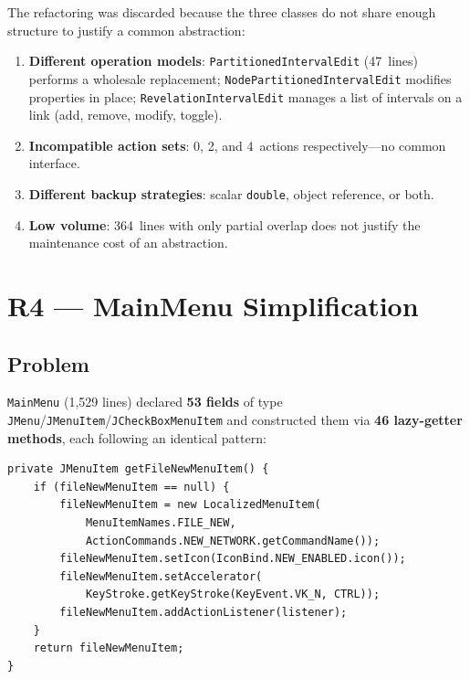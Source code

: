 \documentclass[12pt,a4paper]{article}
\newcommand{\code}[1]{\texttt{#1}}
\newcommand{\cls}[1]{\texttt{#1}}
\begin{document}
The refactoring was discarded because the three classes do not share
enough structure to justify a common abstraction:

\begin{enumerate}
  \item \textbf{Different operation models}:
    \cls{PartitionedIntervalEdit} (47~lines) performs a wholesale
    replacement; \cls{NodePartitionedIntervalEdit} modifies properties
    in place; \cls{RevelationIntervalEdit} manages a list of
    intervals on a link (add, remove, modify, toggle).

  \item \textbf{Incompatible action sets}:
    0, 2, and 4~actions respectively---no common interface.

  \item \textbf{Different backup strategies}:
    scalar \code{double}, object reference, or both.

  \item \textbf{Low volume}: 364~lines with only partial overlap
        does not justify the maintenance cost of an abstraction.
\end{enumerate}

\section{R4 --- MainMenu Simplification}
\label{sec:r4}

\subsection{Problem}

\cls{MainMenu} (1,529 lines) declared \textbf{53 fields} of type
\code{JMenu}/\code{JMenuItem}/\code{JCheckBoxMenuItem} and constructed
them via \textbf{46 lazy-getter methods}, each following an identical
pattern:

\begin{lstlisting}[caption={Typical lazy-getter pattern (repeated 46 times)}]
private JMenuItem getFileNewMenuItem() {
    if (fileNewMenuItem == null) {
        fileNewMenuItem = new LocalizedMenuItem(
            MenuItemNames.FILE_NEW,
            ActionCommands.NEW_NETWORK.getCommandName());
        fileNewMenuItem.setIcon(IconBind.NEW_ENABLED.icon());
        fileNewMenuItem.setAccelerator(
            KeyStroke.getKeyStroke(KeyEvent.VK_N, CTRL));
        fileNewMenuItem.addActionListener(listener);
    }
    return fileNewMenuItem;
}
\end{lstlisting}
\end{document}
